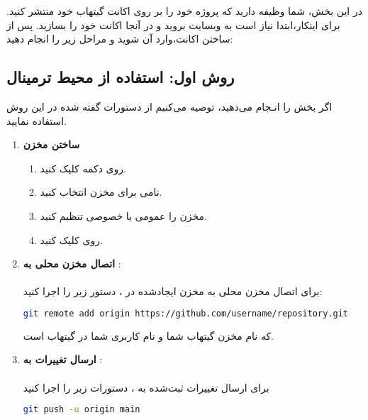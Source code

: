 
در این بخش، شما وظیفه دارید که پروژه خود را بر روی اکانت گیتهاب خود منتشر کنید. برای اینکار،ابتدا نیاز است به وبسایت \href{https://www.github.com}{} بروید و در آنجا اکانت خود را بسازید. پس از ساختن اکانت،وارد آن شوید و مراحل زیر را انجام دهید:

\subsection{روش اول: استفاده از محیط ترمینال}

اگر بخش  را انـجام می‌دهید، توصیه می‌کنیم از دستورات گفته شده در این روش استفاده نمایید.

\begin{enumerate}
    \item \textbf{ساختن مخزن}
    \begin{enumerate}
        \item {روی دکمه  کلیک کنید.}
        \item {نامی برای مخزن انتخاب کنید.}
        \item {مخزن را عمومی یا خصوصی تنظیم کنید.}
        \item {روی   کلیک کنید.}
    \end{enumerate}
    \item \textbf{اتصال مخزن محلی به }:\\\\
    برای اتصال مخزن  محلی به مخزن ایجادشده در ، دستور زیر را اجرا کنید:
    
    \begin{terminal}
    \begin{lstlisting}[language=bash]
    git remote add origin https://github.com/username/repository.git
    \end{lstlisting}
    \end{terminal}

    که  نام مخزن گیتهاب شما و  نام کاربری شما در گیتهاب است.

    \item \textbf{ارسال تغییرات به }:\\\\
    برای ارسال تغییرات ثبت‌شده به ، دستورات زیر را اجرا کنید
    \begin{terminal}
    \begin{lstlisting}[language=bash]
    git push -u origin main
    \end{lstlisting}
    \end{terminal}  
    

\end{enumerate}
